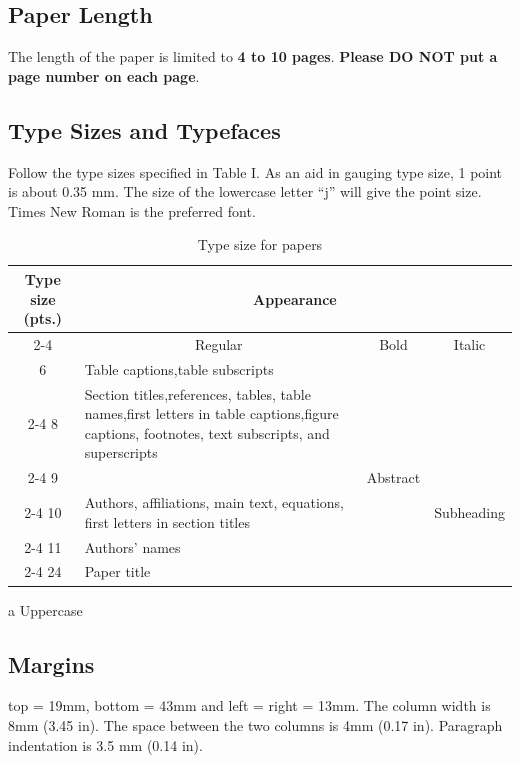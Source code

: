 \documentclass[conference,a4paper]{APSIPA2018}
\begin{document}
\subsection{Paper Length}
The length of the paper is limited to {\bf 4 to 10 pages}. {\bf Please DO NOT put a
page number on each page}.

\subsection{Type Sizes and Typefaces}
Follow the type sizes specified in Table I.  As an aid in gauging type
size, 1 point is about 0.35 mm.  The size of the lowercase letter
``j'' will give the point size.  Times New Roman is the preferred
font.

\begin{table}[b]
\begin{center}
\begin{threeparttable}
\caption{Type size for papers}
\begin{tabular}{|c|p{40mm}|c|c|}
\hline
\multirow{3}{6mm}{\centering Type size (pts.)}
& \multicolumn{3}{c|}{\rule[-5pt]{0pt}{14pt} Appearance}\\
\cline{2-4}
& \multicolumn{1}{c|}{\rule[-5pt]{0pt}{16pt}Regular} & Bold & Italic\\
\hline
6 & Table captions,\tnote{a}\quad table subscripts & & \\
\cline{2-4}
8 & Section titles,\tnote{a}\quad references, tables, table
names,\tnote{a}\quad first letters in table
captions,\tnote{a}\quad figure captions, footnotes, text
subscripts, and superscripts
& & \\
\cline{2-4}
9 & & Abstract & \\
\cline{2-4}
10 & Authors,  affiliations, main text,
equations, first letters in section titles\tnote{a}\quad
& & Subheading \\
\cline{2-4}
11 & Authors' names & & \\
\cline{2-4}
24 & Paper title   & & \\
\hline
\end{tabular}
\begin{tablenotes}
\item[a] Uppercase
\end{tablenotes}
\end{threeparttable}
\end{center}
\end{table}

\subsection{Margins}
top = 19mm, bottom = 43mm and left = right = 13mm.  The column width
is 8mm (3.45 in).  The space between the two columns is 4mm (0.17 in).
Paragraph indentation is 3.5 mm (0.14 in).
\end{document}
